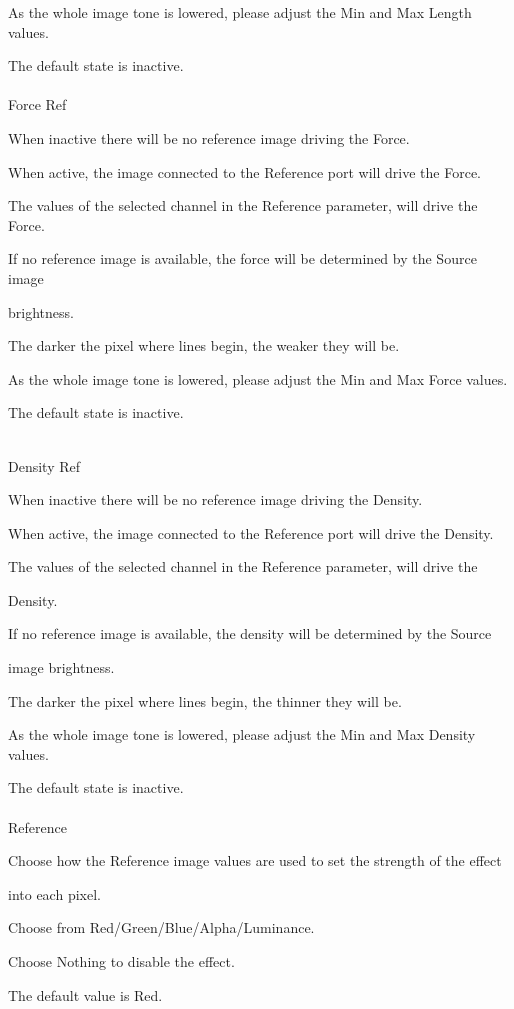 \documentclass[a4paper,12pt]{article}
\begin{document}
As the whole image tone is lowered, please adjust the Min and Max Length values.\par
The default state is inactive.\\
\\
Force Ref\par
When inactive there will be no reference image driving the Force.\par
When active, the image connected to the Reference port will drive the Force.\par
The values of the selected channel in the Reference parameter, will drive the Force.\par
If no reference image is available, the force will be determined by the Source image\par 
brightness.\par
The darker the pixel where lines begin, the weaker they will be.\par
As the whole image tone is lowered, please adjust the Min and Max Force values.\par
The default state is inactive.\\
\newpage

\thispagestyle{empty}

\ \vspace{1.3em}
\\
Density Ref\par
When inactive there will be no reference image driving the Density.\par
When active, the image connected to the Reference port will drive the Density.\par
The values of the selected channel in the Reference parameter, will drive the\par 
Density.\par
If no reference image is available, the density will be determined by the Source\par 
image brightness.\par
The darker the pixel where lines begin, the thinner they will be.\par
As the whole image tone is lowered, please adjust the Min and Max Density values.\par
The default state is inactive.\\
\\
Reference\par
Choose how the Reference image values are used to set the strength of the effect\par 
into each pixel.\par
Choose from Red/Green/Blue/Alpha/Luminance.\par
Choose Nothing to disable the effect.\par
The default value is Red.
\end{document}
